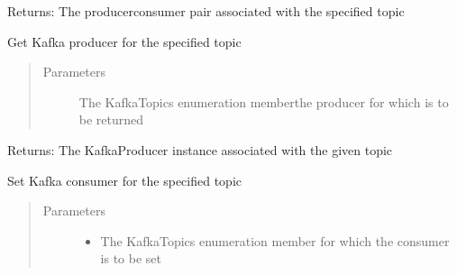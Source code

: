 \documentclass[letterpaper,10pt,english]{sphinxmanual}
\begin{document}
\begin{fulllineitems}
\begin{fulllineitems}
\begin{quote}
\begin{description}
\end{description}\end{quote}

\sphinxAtStartPar
Returns: The producer\sphinxhyphen{}consumer pair associated with the specified topic

\end{fulllineitems}


\begin{fulllineitems}
\label{\detokenize{Forge:Forge.KafkaClient.get_producer}}
\sphinxAtStartPar
Get Kafka producer for the specified topic
\begin{quote}\begin{description}
\item[{Parameters}] \leavevmode
\sphinxAtStartPar
{} \textendash{} The KafkaTopics enumeration member\textendash{}the producer for which is to be returned

\end{description}\end{quote}

\sphinxAtStartPar
Returns: The KafkaProducer instance associated with the given topic

\end{fulllineitems}


\begin{fulllineitems}
\label{\detokenize{Forge:Forge.KafkaClient.set_consumer}}
\sphinxAtStartPar
Set Kafka consumer for the specified topic
\begin{quote}\begin{description}
\item[{Parameters}] \leavevmode\begin{itemize}
\item {} 
\sphinxAtStartPar
{} \textendash{} The KafkaTopics enumeration member for which the consumer is to be set


\end{itemize}
\end{description}
\end{quote}
\end{fulllineitems}
\end{fulllineitems}
\end{document}
